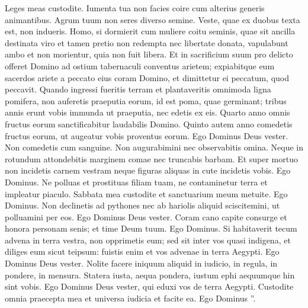 \begin{biblechapter}
\begin{biblechapter}
\begin{biblechapter}
\begin{biblechapter}
\begin{biblechapter}
\begin{biblechapter}
\begin{biblechapter}
\begin{biblechapter}
\begin{biblechapter}
\begin{biblechapter}
\begin{biblechapter}
\begin{biblechapter}
\begin{biblechapter}
\begin{biblechapter}
\begin{biblechapter}
\begin{biblechapter}
\begin{biblechapter}
\begin{biblechapter}
\begin{biblechapter}
 \verse Leges meas custodite.
 Iumenta tua non facies coire cum alterius generis animantibus. Agrum tuum non seres diverso semine. Veste, quae ex duobus texta est, non indueris.
 \verse Homo, si dormierit cum muliere coitu seminis, quae sit ancilla destinata viro et tamen pretio non redempta nec libertate donata, vapulabunt ambo et non morientur, quia non fuit libera. 
\verse Et in sacrificium suum pro delicto offeret Domino ad ostium tabernaculi conventus arietem; 
\verse expiabitque eum sacerdos ariete a peccato eius coram Domino, et dimittetur ei peccatum, quod peccavit.
 \verse Quando ingressi fueritis terram et plantaveritis omnimoda ligna pomifera, non auferetis praeputia eorum, id est poma, quae germinant; tribus annis erunt vobis immunda ut praeputia, nec edetis ex eis. 
\verse Quarto anno omnis fructus eorum sanctificabitur laudabilis Domino. 
\verse Quinto autem anno comedetis fructus eorum, ut augeatur vobis proventus eorum. Ego Dominus Deus vester.
 \verse Non comedetis cum sanguine.
 Non augurabimini nec observabitis omina.
 \verse Neque in rotundum attondebitis marginem comae nec truncabis barbam. 
\verse Et super mortuo non incidetis carnem vestram neque figuras aliquas in cute incidetis vobis. Ego Dominus.
 \verse Ne polluas et prostituas filiam tuam, ne contaminetur terra et impleatur piaculo.
 \verse Sabbata mea custodite et sanctuarium meum metuite. Ego Dominus.
 \verse Non declinetis ad pythones nec ab hariolis aliquid sciscitemini, ut polluamini per eos. Ego Dominus Deus vester.
 \verse Coram cano capite consurge et honora personam senis; et time Deum tuum. Ego Dominus.
 \verse Si habitaverit tecum advena in terra vestra, non opprimetis eum; 
\verse sed sit inter vos quasi indigena, et diliges eum sicut teipsum: fuistis enim et vos advenae in terra Aegypti. Ego Dominus Deus vester.
 \verse Nolite facere iniquum aliquid in iudicio, in regula, in pondere, in mensura. \verse Statera iusta, aequa pondera, iustum ephi aequumque hin sint vobis. Ego Dominus Deus vester, qui eduxi vos de terra Aegypti.
 \verse Custodite omnia praecepta mea et universa iudicia et facite ea. Ego Dominus ”.
 

\end{biblechapter}
\end{biblechapter}
\end{biblechapter}
\end{biblechapter}
\end{biblechapter}
\end{biblechapter}
\end{biblechapter}
\end{biblechapter}
\end{biblechapter}
\end{biblechapter}
\end{biblechapter}
\end{biblechapter}
\end{biblechapter}
\end{biblechapter}
\end{biblechapter}
\end{biblechapter}
\end{biblechapter}
\end{biblechapter}
\end{biblechapter}
